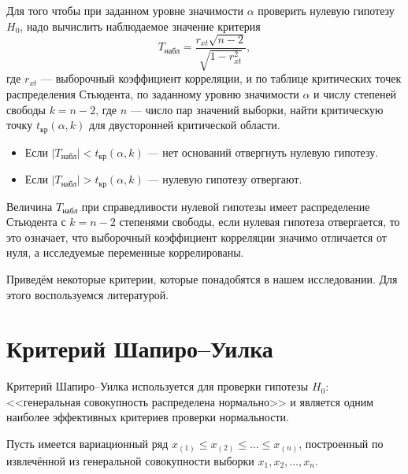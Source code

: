 Для того чтобы при заданном уровне значимости $\alpha$ проверить нулевую гипотезу $H_0$, надо вычислить наблюдаемое значение критерия
\begin{equation*}
	T_{\textrm{набл}} = \frac{r_{xt}\sqrt{n - 2}}{\sqrt{1 - r_{xt}^{2}}},
\end{equation*}
где $r_{xt}$ --- выборочный коэффициент корреляции, и по таблице критических точек распределения Стьюдента, по заданному уровню значимости $\alpha$ и числу степеней свободы $k = n - 2$, где $n$ --- число пар значений выборки, найти критическую точку $t_{\textrm{кр}}(\alpha, k)$ для двусторонней критической области.
\begin{itemize}
	\item Если $\vert T_{\textrm{набл}} \vert < t_{\textrm{кр}}(\alpha, k)$ --- нет оснований отвергнуть нулевую гипотезу.
	\item Если $\vert T_{\textrm{набл}} \vert > t_{\textrm{кр}}(\alpha, k)$ --- нулевую гипотезу отвергают.
\end{itemize}

Величина $T_{\textrm{набл}}$ при справедливости нулевой гипотезы имеет распределение Стьюдента с $k = n - 2$ степенями свободы, если нулевая гипотеза отвергается, то это означает, что выборочный коэффициент корреляции значимо отличается от нуля, а исследуемые переменные коррелированы.


Приведём некоторые критерии, которые понадобятся в нашем исследовании. Для этого воспользуемся литературой.

\section*{Критерий Шапиро--Уилка} %
\label{sec:shapiro_wilk}

Критерий Шапиро--Уилка используется для проверки гипотезы $H_0$: <<генеральная совокупность распределена нормально>> и является одним наиболее эффективных критериев проверки нормальности. 

Пусть имеется вариационный ряд $x_{(1)} \le x_{(2)} \le \ldots \le x_{(n)}$, построенный по извлечённой из генеральной совокупности выборки $x_1, x_2, \ldots, x_n$.


